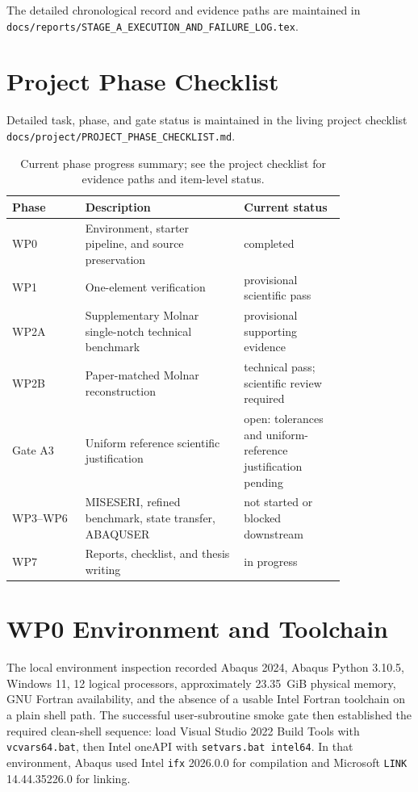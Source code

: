 \documentclass[11pt,a4paper]{article}
\begin{document}
The detailed chronological record and evidence paths are maintained in \texttt{docs/reports/STAGE\_A\_EXECUTION\_AND\_FAILURE\_LOG.tex}.

\section{Project Phase Checklist}

Detailed task, phase, and gate status is maintained in the living project checklist \texttt{docs/project/PROJECT\_PHASE\_CHECKLIST.md}.

\begin{table}[H]
\centering
\caption{Current phase progress summary; see the project checklist for evidence paths and item-level status.}
\begin{tabular}{p{0.18\linewidth} p{0.39\linewidth} p{0.25\linewidth}}
\toprule
Phase & Description & Current status \\
\midrule
WP0 & Environment, starter pipeline, and source preservation & completed \\
WP1 & One-element verification & provisional scientific pass \\
WP2A & Supplementary Molnar single-notch technical benchmark & provisional supporting evidence \\
WP2B & Paper-matched Molnar reconstruction & technical pass; scientific review required \\
Gate A3 & Uniform reference scientific justification & open: tolerances and uniform-reference justification pending \\
WP3--WP6 & MISESERI, refined benchmark, state transfer, ABAQUSER & not started or blocked downstream \\
WP7 & Reports, checklist, and thesis writing & in progress \\
\bottomrule
\end{tabular}
\end{table}

\section{WP0 Environment and Toolchain}

The local environment inspection recorded Abaqus 2024, Abaqus Python 3.10.5, Windows 11, 12 logical processors, approximately \SI{23.35}{GiB} physical memory, GNU Fortran availability, and the absence of a usable Intel Fortran toolchain on a plain shell path. The successful user-subroutine smoke gate then established the required clean-shell sequence: load Visual Studio 2022 Build Tools with \texttt{vcvars64.bat}, then Intel oneAPI with \texttt{setvars.bat intel64}. In that environment, Abaqus used Intel \texttt{ifx} 2026.0.0 for compilation and Microsoft \texttt{LINK} 14.44.35226.0 for linking.
\end{document}
